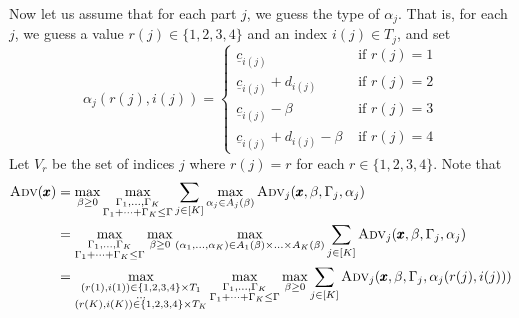 \documentclass[a4paper,11pt,abstracton]{scrartcl}
\theoremstyle{definition}
\theoremstyle{remark}
\begin{document}
Now let us assume that for each part $j$, we guess the type of $\alpha_j$. That is, for each $j$, we guess a value $r(j)\in\{1,2,3,4\}$ and an index $i(j)\in T_j$, and set 
\[ \alpha_j(r(j),i(j)) = \begin{cases}
\underline{c}_{i(j)} & \text{ if } r(j)=1 \\
\underline{c}_{i(j)} + d_{i(j)} & \text{ if } r(j) = 2 \\
\underline{c}_{i(j)} - \beta & \text{ if } r(j)=3 \\
\underline{c}_{i(j)} + d_{i(j)} - \beta & \text{ if } r(j) = 4
\end{cases} \]
Let $V_r$ be the set of indices $j$ where $r(j) = r$ for each $r\in\{1,2,3,4\}$. Note that
\begin{align}\label{eq:ad-rj-ij}
\textsc{Adv}(\pmb{x}) &= \max_{\beta \ge 0} \max_{\substack{\Gamma_1,\ldots,\Gamma_K\\ \Gamma_1 + \dots + \Gamma_K \leq \Gamma}}  \sum_{j\in[K]}  \max_{\alpha_j \in A_j(\beta)} \textsc{Adv}_j(\pmb{x},\beta,\Gamma_j,\alpha_j)  \\
&= \max_{\substack{\Gamma_1,\ldots,\Gamma_K\\ \Gamma_1 + \dots + \Gamma_K \leq \Gamma}} 
\max_{\beta \ge 0} 
 \max_{(\alpha_1,\ldots,\alpha_K) \in A_1(\beta)\times\ldots\times A_K(\beta)}
\sum_{j\in[K]}
\textsc{Adv}_j(\pmb{x},\beta,\Gamma_j,\alpha_j) \nonumber \\
&= \max_{\substack{(r(1),i(1)) \in \{1,2,3,4\}\times T_1 \\ \ldots \\(r(K),i(K)) \in \{1,2,3,4\}\times T_K}}
\max_{\substack{\Gamma_1,\ldots,\Gamma_K\\ \Gamma_1 + \dots + \Gamma_K \leq \Gamma}} 
\max_{\beta \ge 0} 
\sum_{j\in[K]}
\textsc{Adv}_j(\pmb{x},\beta,\Gamma_j,\alpha_j(r(j),i(j))) \nonumber
\end{align}
\end{document}
